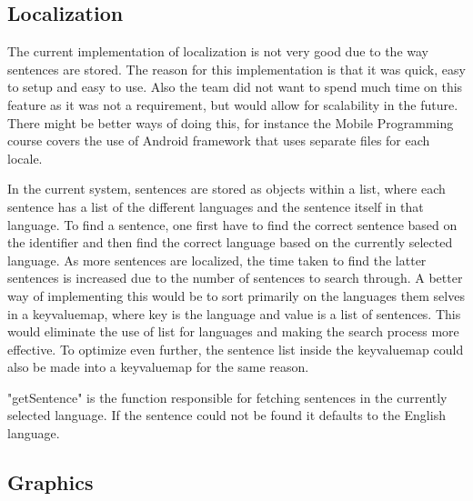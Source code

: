 \subsection{Localization}



The current implementation of \gls{localization} is not very good due to the way sentences are stored. The reason for this implementation is that it was quick, easy to setup and easy to use. Also the team did not want to spend much time on this feature as it was not a requirement, but would allow for scalability in the future. There might be better ways of doing this, for instance the Mobile Programming course\cite{course:mobileWearable} covers the use of Android framework that uses separate files for each locale. 

In the current system, sentences are stored as objects within a list, where each sentence has a list of the different languages and the sentence itself in that language. To find a sentence, one first have to find the correct sentence based on the identifier and then find the correct language based on the currently selected language. As more sentences are localized, the time taken to find the latter sentences is increased due to the number of sentences to search through. A better way of implementing this would be to sort primarily on the languages them selves in a \gls{keyvaluemap}, where key is the language and value is a list of sentences. This would eliminate the use of list for languages and making the search process more effective. To optimize even further, the sentence list inside the \gls{keyvaluemap} could also be made into a \gls{keyvaluemap} for the same reason. 

"getSentence" is the function responsible for fetching sentences in the currently selected language. If the sentence could not be found it defaults to the English language. 

\subsection{Graphics}
\label{subsection:graphicsFunctionLinking}

